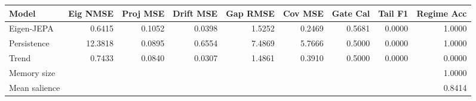 \begin{tabular}{lrrrrrrrr}
\toprule
Model & Eig NMSE & Proj MSE & Drift MSE & Gap RMSE & Cov MSE & Gate Cal & Tail F1 & Regime Acc \\
\midrule
Eigen-JEPA & 0.6415 & 0.1052 & 0.0398 & 1.5252 & 0.2469 & 0.5681 & 0.0000 & 1.0000 \\
Persistence & 12.3818 & 0.0895 & 0.6554 & 7.4869 & 5.7666 & 0.5000 & 0.0000 & 1.0000 \\
Trend & 0.7433 & 0.0840 & 0.0307 & 1.4861 & 0.3910 & 0.5000 & 0.0000 & 0.0000 \\
\midrule
Memory size & \multicolumn{8}{r}{1.0000} \\
Mean salience & \multicolumn{8}{r}{0.8414} \\
\bottomrule
\end{tabular}